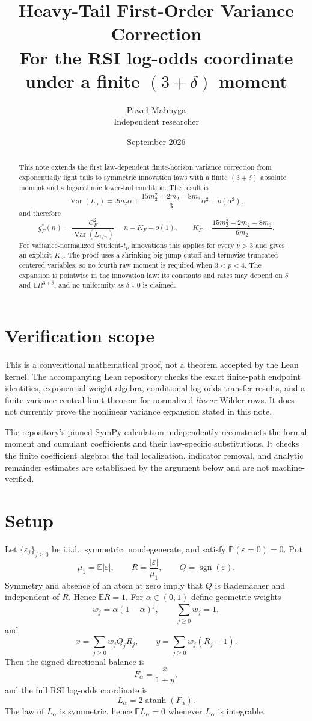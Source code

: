 \documentclass[11pt,a4paper]{article}
\title{Heavy-Tail First-Order Variance Correction\\\large For the RSI log-odds coordinate under a finite $(3+\delta)$ moment}
\author{Pawe{\l} Ma{\l}myga\\\small Independent researcher}
\date{September 2026}
\newcommand{\E}{\mathbb E}
\newcommand{\Var}{\operatorname{Var}}
\newcommand{\Prob}{\mathbb P}
\newcommand{\atanh}{\operatorname{atanh}}
\begin{document}
\maketitle

\begin{abstract}
This note extends the first law-dependent finite-horizon variance correction
from exponentially light tails to symmetric innovation laws with a finite
$(3+\delta)$ absolute moment and a logarithmic lower-tail condition.  The
result is
\[
\Var(L_\alpha)=2m_2\alpha+\frac{15m_2^2+2m_2-8m_3}{3}\alpha^2+o(\alpha^2),
\]
and therefore
\[
g_F^*(n)=\frac{C_F^2}{\Var(L_{1/n})}=n-K_F+o(1),
\qquad
K_F=\frac{15m_2^2+2m_2-8m_3}{6m_2}.
\]
For variance-normalized Student-$t_\nu$ innovations this applies for every
$\nu>3$ and gives an explicit $K_\nu$.  The proof uses a shrinking big-jump
cutoff and termwise-truncated centered variables, so no fourth raw moment is
required when $3<p<4$.  The expansion is pointwise in the innovation law: its
constants and rates may depend on $\delta$ and $\E R^{3+\delta}$, and no
uniformity as $\delta\downarrow0$ is claimed.
\end{abstract}

\section*{Verification scope}
This is a conventional mathematical proof, not a theorem accepted by the Lean
kernel.  The accompanying Lean repository checks
the exact finite-path endpoint identities, exponential-weight algebra,
conditional log-odds transfer results, and a finite-variance central limit
theorem for normalized \emph{linear} Wilder rows.  It does not currently prove
the nonlinear variance expansion stated in this note.

The repository's pinned SymPy calculation independently reconstructs the
formal moment and cumulant coefficients and their law-specific substitutions.
It checks the finite coefficient algebra; the tail localization, indicator
removal, and analytic remainder estimates are established by the argument
below and are not machine-verified.

\section{Setup}
Let $\{\varepsilon_j\}_{j\ge0}$ be i.i.d., symmetric, nondegenerate, and satisfy $\Prob(\varepsilon=0)=0$.  Put
\[
\mu_1=\E|\varepsilon|,\qquad R=\frac{|\varepsilon|}{\mu_1},\qquad Q=\operatorname{sgn}(\varepsilon).
\]
Symmetry and absence of an atom at zero imply that $Q$ is Rademacher and independent of $R$.  Hence $\E R=1$.  For $\alpha\in(0,1)$ define geometric weights
\[
w_j=\alpha(1-\alpha)^j,\qquad \sum_{j\ge0}w_j=1,
\]
and
\[
x=\sum_{j\ge0}w_jQ_jR_j,\qquad y=\sum_{j\ge0}w_j(R_j-1).
\]
Then the signed directional balance is
\[
F_\alpha=\frac{x}{1+y},
\]
and the full RSI log-odds coordinate is
\[
L_\alpha=2\atanh(F_\alpha).
\]
The law of $L_\alpha$ is symmetric, hence $\E L_\alpha=0$ whenever $L_\alpha$ is integrable.
\end{document}
